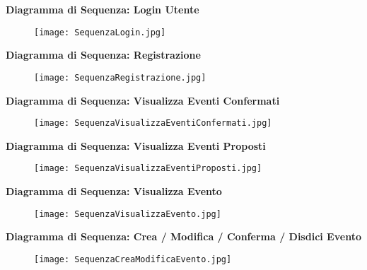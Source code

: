 \textbf{Diagramma di Sequenza: Login Utente}

\begin{figure}[h!]
    \begin{center}
        \texttt{[image: SequenzaLogin.jpg]}
    \end{center}
\end{figure}
\hfill \break

\textbf{Diagramma di Sequenza: Registrazione}

\begin{figure}[h!]
    \begin{center}
        \texttt{[image: SequenzaRegistrazione.jpg]}
    \end{center}
\end{figure}
\hfill \break
\newpage

\textbf{Diagramma di Sequenza: Visualizza Eventi Confermati}

\begin{figure}[h!]
    \begin{center}
        \texttt{[image: SequenzaVisualizzaEventiConfermati.jpg]}
    \end{center}
\end{figure}
\hfill \break

\textbf{Diagramma di Sequenza: Visualizza Eventi Proposti}

\begin{figure}[h!]
    \begin{center}
        \texttt{[image: SequenzaVisualizzaEventiProposti.jpg]}
    \end{center}
\end{figure}
\hfill \break
\newpage
\textbf{Diagramma di Sequenza: Visualizza Evento}

\begin{figure}[h!]
    \begin{center}
        \texttt{[image: SequenzaVisualizzaEvento.jpg]}
    \end{center}
\end{figure}
\hfill \break


\textbf{Diagramma di Sequenza: Crea / Modifica / Conferma / Disdici Evento}

\begin{figure}[h!]
    \begin{center}
        \texttt{[image: SequenzaCreaModificaEvento.jpg]}
    \end{center}
\end{figure}
\hfill \break

